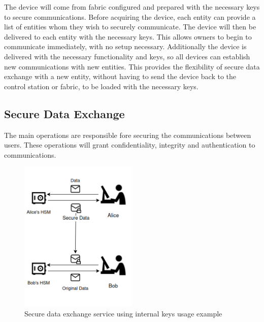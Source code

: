The device will come from fabric configured and prepared with the necessary keys to secure communications.
Before acquiring the device, each entity can provide a list of entities whom they wish to securely communicate. The device will then be delivered to each entity with the necessary keys. This allows owners to begin to communicate immediately, with no setup necessary.
Additionally the device is delivered with the necessary functionality and keys, so all devices can establish new communications with new entities. This provides the flexibility of secure data exchange with a new entity, without having to send the device back to the control station or fabric, to be loaded with the necessary keys.

\subsection{Secure Data Exchange}\label{chap:arch:services:data}

The main operations are responsible fore securing the communications between users. These operations will grant confidentiality, integrity and authentication to communications.

\begin{figure}[h]
    \centering
    \includegraphics[width=0.5\textwidth]{./Images/arch-data-service.png}
    \caption{Secure data exchange service using internal keys usage example}
    \label{fig:arch:data-service}
\end{figure}

